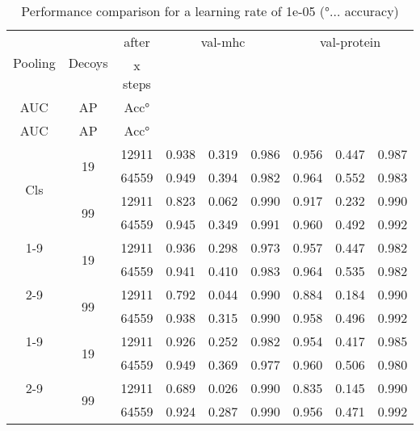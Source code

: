 \documentclass[msc,deptreport,ai]{infthesis} %
\begin{document}
		\begin{table}[H]
			\vskip 3mm
			\begin{center}
			\begin{small}
			\begin{sc}
			\begin{tabular}{| c | c | c | c c c | c c c |}
			\hline
			\multirow{2}{*}{Pooling}		& \multirow{2}{*}{Decoys}		& after				& \multicolumn{3}{c|}{val-mhc}		& \multicolumn{3}{c|}{val-protein} \\
								&						& x steps				& {\tiny\makecell{\gls{ROC}\\ \gls{AUC}}}	& \gls{AP}		& Acc°  	& {\tiny\makecell{\gls{ROC}\\ \gls{AUC}}}	& \gls{AP}		& Acc° \\
			\hline
			\hline
			\multirow{4}{*}{Cls}		& \multirow{2}{*}{19}			& 12911				& 0.938 & 0.319 & 0.986 & 0.956 & 0.447 & 0.987 \\	
								& 						& 64559				& {\color{red}0.949} & 0.394 & 0.982 & {\color{red}0.964} & {\color{red}0.552} & 0.983 \\
								\cline{2-9}
								& \multirow{2}{*}{99}			& 12911				& 0.823 & 0.062 & 0.990 & 0.917 & 0.232 & 0.990 \\
								& 						& 64559				& 0.945 & 0.349 & {\color{red}0.991} & 0.960 & 0.492 & {\color{red}0.992} \\
			\cline{1-9}
			\multirow{4}{*}{Attn}		& \multirow{2}{*}{19}			& 12911				& 0.936 & 0.298 & 0.973 & 0.957 & 0.447 & 0.982 \\
								& 						& 64559				& 0.941 & {\color{red}0.410} & 0.983 & {\color{red}0.964} & 0.535 & 0.982 \\
								\cline{2-9}
								& \multirow{2}{*}{99}			& 12911				& 0.792 & 0.044 & 0.990 & 0.884 & 0.184 & 0.990 \\
								& 						& 64559				& 0.938 & 0.315 & 0.990 & 0.958 & 0.496 & {\color{red}0.992} \\
			\cline{1-9}
			\multirow{4}{*}{Avg}		& \multirow{2}{*}{19}			& 12911				& 0.926 & 0.252 & 0.982 & 0.954 & 0.417 & 0.985 \\
								& 						& 64559				& {\color{red}0.949} & 0.369 & 0.977 & 0.960 & 0.506 & 0.980 \\
								\cline{2-9}
								& \multirow{2}{*}{99}			& 12911				& 0.689 & 0.026 & 0.990 & 0.835 & 0.145 & 0.990 \\
								& 						& 64559				& 0.924 & 0.287 & 0.990 & 0.956 & 0.471 & {\color{red}0.992} \\
	
			\hline
			\end{tabular}
			\end{sc}
			\end{small}
			\caption{Performance comparison for a learning rate of 1e-05 (°... accuracy)}
			\label{tab:hparam_e05}
			\end{center}
			\vskip -7mm
		\end{table}	
\end{document}
